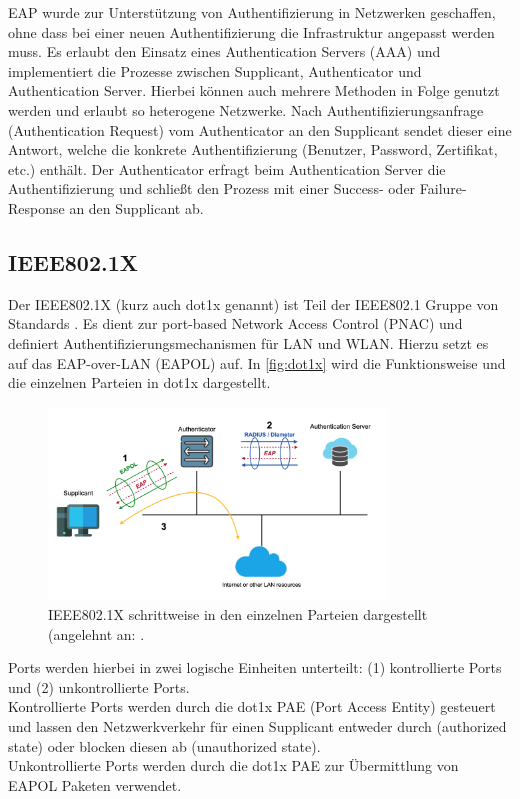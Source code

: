 \documentclass[conference]{IEEEtran}
\begin{document}
EAP wurde zur Unterstützung von Authentifizierung in Netzwerken geschaffen, ohne dass  bei einer neuen Authentifizierung die Infrastruktur angepasst werden muss. Es erlaubt den Einsatz eines Authentication Servers (AAA) und implementiert die Prozesse zwischen Supplicant, Authenticator und Authentication Server. Hierbei können auch mehrere Methoden in Folge genutzt werden und erlaubt so heterogene Netzwerke. Nach Authentifizierungsanfrage (Authentication Request) vom Authenticator an den Supplicant sendet dieser eine Antwort, welche die konkrete Authentifizierung (Benutzer, Password, Zertifikat, etc.) enthält. Der Authenticator erfragt beim Authentication Server die Authentifizierung und schließt den Prozess mit einer Success- oder Failure-Response an den Supplicant ab.

\vspace{.5em}
\subsection{IEEE802.1X}
Der IEEE802.1X (kurz auch dot1x genannt) ist Teil der IEEE802.1 Gruppe von Standards \cite{5409813}. Es dient zur port-based Network Access Control (PNAC) und definiert Authentifizierungsmechanismen für LAN und WLAN. Hierzu setzt es auf das EAP-over-LAN (EAPOL) auf. In \autoref{fig:dot1x} wird die Funktionsweise und die einzelnen Parteien in dot1x dargestellt.\\

\begin{figure}[hbt]
	\centering
	\includegraphics[width=9cm]{figures/dot1x}
	\caption{IEEE802.1X schrittweise in den einzelnen Parteien dargestellt (angelehnt an: \cite{eap}.}
	\label{fig:dot1x}
\end{figure}

Ports werden hierbei in zwei logische Einheiten unterteilt: (1) kontrollierte Ports und (2) unkontrollierte Ports. \cite{aboba2004extensible}\\
Kontrollierte Ports werden durch die dot1x PAE (Port Access Entity) gesteuert und lassen den Netzwerkverkehr für einen Supplicant entweder durch (authorized state) oder blocken diesen ab (unauthorized state).\\
Unkontrollierte Ports werden durch die dot1x PAE zur Übermittlung von EAPOL Paketen verwendet.
\end{document}
